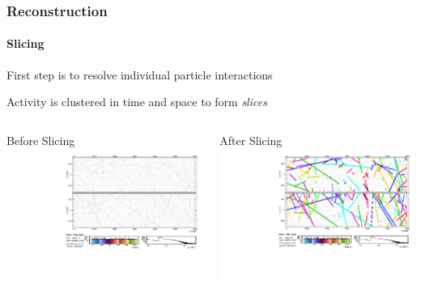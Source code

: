 \documentclass[10pt,professionalfonts,xcolor=table]{beamer}
\begin{document}
\begin{frame}

\frametitle{Reconstruction}
\framesubtitle{Slicing}

\bangon
\item First step is to resolve individual particle interactions
\gap
\item Activity is clustered in time and space to form \textit{slices}
\bangoff
\gap
\gap
\begin{columns}[b]
\centering
\textcolor{custom_red}{Before Slicing}
\includegraphics[height=\textwidth, angle=-90]{figures/evd_steps/evd_hits.pdf}

\centering
\textcolor{custom_red}{After Slicing}
\includegraphics[height=\textwidth, angle=-90]{figures/evd_steps/evd_slice.pdf}


\end{columns}
\end{frame}
\end{document}
